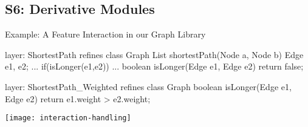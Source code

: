 \subsection{S6: Derivative Modules}

\begin{frame}{\myframetitle}
\end{frame}

\begin{frame}[fragile]{Example: A Feature Interaction in our Graph Library}
	\begin{mycolumns}[widths={50,50},animation=none]
\begin{codetight}{layer: ShortestPath}
refines class Graph {
	List shortestPath(Node a, Node b){
		Edge e1, e2;
		...
		if(isLonger(e1,e2)) 
		... 
	}
	boolean isLonger(Edge e1, Edge e2){
		return false;
	}
}
\end{codetight}	
	\mynextcolumn
\begin{codetight}{layer: ShortestPath\_Weighted}
refines class Graph {
	boolean isLonger(Edge e1, Edge e2){
		return e1.weight > e2.weight;
	}
}
\end{codetight}	
	\end{mycolumns}
\end{frame}

	\centering\texttt{[image: interaction-handling]}


